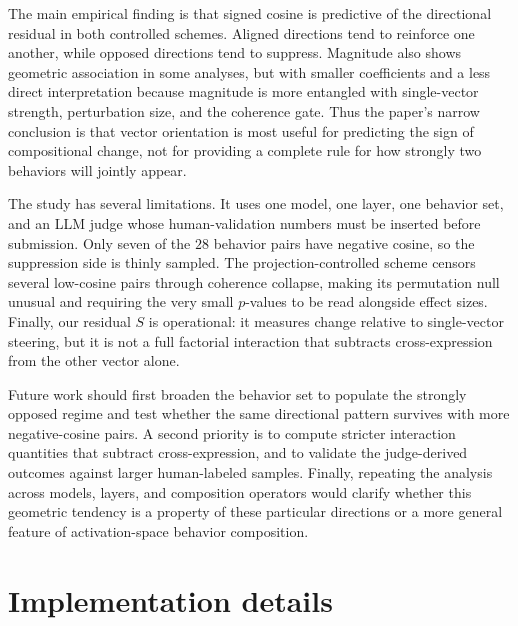 \documentclass{article}
\begin{document}
The main empirical finding is that signed cosine is predictive of the directional residual in both
controlled schemes. Aligned directions tend to reinforce one another, while opposed directions tend
to suppress. Magnitude also shows geometric association in some analyses, but with smaller
coefficients and a less direct interpretation because magnitude is more entangled with single-vector
strength, perturbation size, and the coherence gate. Thus the paper's narrow conclusion is that
vector orientation is most useful for predicting the sign of compositional change, not for providing
a complete rule for how strongly two behaviors will jointly appear.

The study has several limitations. It uses one model, one layer, one behavior set, and an LLM judge
whose human-validation numbers must be inserted before submission. Only seven of the $28$ behavior
pairs have negative cosine, so the suppression side is thinly sampled. The projection-controlled
scheme censors several low-cosine pairs through coherence collapse, making its permutation null
unusual and requiring the very small $p$-values to be read alongside effect sizes. Finally, our
residual $S$ is operational: it measures change relative to single-vector steering, but it is not a
full factorial interaction that subtracts cross-expression from the other vector alone.

Future work should first broaden the behavior set to populate the strongly opposed regime and test
whether the same directional pattern survives with more negative-cosine pairs. A second priority is
to compute stricter interaction quantities that subtract cross-expression, and to validate the
judge-derived outcomes against larger human-labeled samples. Finally, repeating the analysis across
models, layers, and composition operators would clarify whether this geometric tendency is a
property of these particular directions or a more general feature of activation-space behavior
composition.




\appendix

\section{Implementation details}
\label{app:impl}
\end{document}
